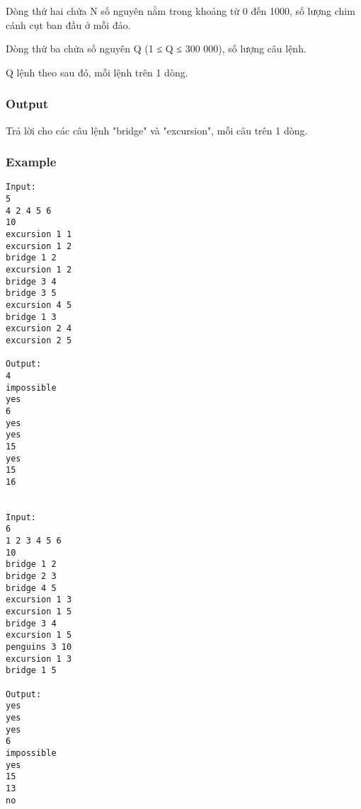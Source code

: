    Dòng thứ hai chứa N số nguyên nằm trong khoảng từ 0 đến 1000, số lượng chim cánh cụt ban đầu ở mỗi đảo.  

   Dòng thứ ba chứa số nguyên Q (1 ≤ Q ≤ 300 000), số lượng câu lệnh.  

   Q lệnh theo sau đó, mỗi lệnh trên 1 dòng.  

\subsubsection{   Output  }

   Trả lời cho các câu lệnh "bridge" và "excursion", mỗi câu trên 1 dòng.  

\subsubsection{   Example  }
\begin{verbatim}
Input:
5
4 2 4 5 6
10
excursion 1 1
excursion 1 2
bridge 1 2
excursion 1 2
bridge 3 4
bridge 3 5
excursion 4 5
bridge 1 3
excursion 2 4
excursion 2 5

Output:
4
impossible
yes
6
yes
yes
15
yes
15
16


Input:
6
1 2 3 4 5 6
10
bridge 1 2
bridge 2 3
bridge 4 5
excursion 1 3
excursion 1 5
bridge 3 4
excursion 1 5
penguins 3 10
excursion 1 3
bridge 1 5

Output:
yes
yes
yes
6
impossible
yes
15
13
no
\end{verbatim}